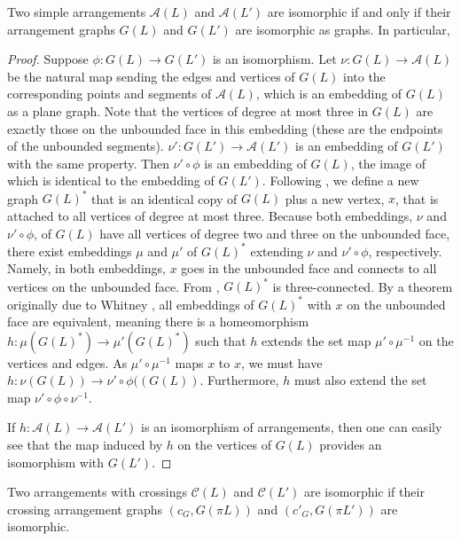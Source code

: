 \documentclass[11pt, oneside]{article}
\begin{document}
\begin{lem}
Two simple arrangements $\mathcal{A}(L)$ and $\mathcal{A}(L')$ are isomorphic if and only if their arrangement graphs $G(L)$ and $G(L')$ are isomorphic as graphs. In particular, 
\end{lem}

\begin{proof}
Suppose $\phi: G(L) \to G(L')$ is an isomorphism. Let $\nu:G(L) \to \mathcal{A}(L)$ be the natural map sending the edges and vertices of $G(L)$ into the corresponding points and segments of $\mathcal{A}(L)$, which is an embedding of $G(L)$ as a plane graph. Note that the vertices of degree at most three in $G(L)$ are exactly those on the unbounded face in this embedding (these are the endpoints of the unbounded segments).  $\nu': G(L') \to \mathcal{A}(L')$ is an embedding of $G(L')$ with the same property. Then $\nu' \circ \phi$ is an embedding of $G(L)$, the image of which is identical to the embedding of $G(L')$. Following \cite{bose}, we define a new graph $G(L)^*$ that is an identical copy of $G(L)$ plus a new vertex, $x$, that is attached to all vertices of degree at most three. Because both embeddings, $\nu$ and $\nu'\circ\phi$, of $G(L)$ have all vertices of degree two and three on the unbounded face, there exist embeddings $\mu$ and $\mu'$ of $G(L)^*$ extending $\nu$ and $\nu' \circ \phi$, respectively. Namely, in both embeddings, $x$ goes in the unbounded face and connects to all vertices on the unbounded face. From \cite{bose}, $G(L)^*$ is three-connected. By a theorem originally due to Whitney \cite{diestel}, all embeddings of $G(L)^*$ with $x$ on the unbounded face are equivalent, meaning there is a homeomorphism $h:\mu(G(L)^*) \to \mu'(G(L)^*)$ such that $h$ extends the set map $\mu' \circ \mu^{-1}$ on the vertices and edges. As $\mu' \circ \mu^{-1}$ maps $x$ to $x$, we must have $h: \nu(G(L)) \to \nu' \circ \phi((G(L))$. Furthermore, $h$ must also extend the set map $\nu' \circ \phi \circ \nu^{-1}$.

If $h:\mathcal{A}(L) \to \mathcal{A}(L')$ is an isomorphism of arrangements, then one can easily see that the map induced by $h$ on the vertices of $G(L)$ provides an isomorphism with $G(L')$. \end{proof}
 
 \begin{lem}\label{cgraphtoarr}
Two arrangements with crossings $\mathcal{C}(L)$ and $\mathcal{C}(L')$ are isomorphic if their crossing arrangement graphs $(c_G, G(\pi L))$ and $(c'_G, G(\pi L'))$ are isomorphic.
\end{lem}
\end{document}
